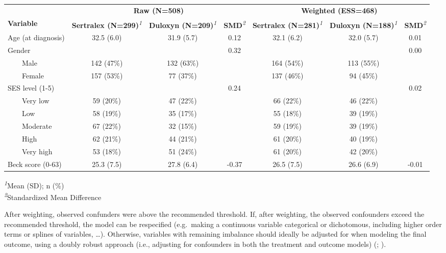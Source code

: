 \documentclass[
]{book}
\begin{document}
\begin{table}[!t]
\fontsize{12.0pt}{14.4pt}\selectfont
\begin{tabular*}{\linewidth}{@{\extracolsep{\fill}}lcccccc}
\toprule
 & \multicolumn{3}{c}{\textbf{Raw (N=508)}} & \multicolumn{3}{c}{\textbf{Weighted (ESS=468)}} \\ 
\cmidrule(lr){2-4} \cmidrule(lr){5-7}
\textbf{Variable} & \textbf{Sertralex (N=299)}\textsuperscript{\textit{1}} & \textbf{Duloxyn (N=209)}\textsuperscript{\textit{1}} & \textbf{SMD}\textsuperscript{\textit{2}} & \textbf{Sertralex (N=281)}\textsuperscript{\textit{1}} & \textbf{Duloxyn (N=188)}\textsuperscript{\textit{1}} & \textbf{SMD}\textsuperscript{\textit{2}} \\ 
\midrule\addlinespace[2.5pt]
Age (at diagnosis) & 32.5 (6.0) & 31.9 (5.7) & 0.12 & 32.1 (6.2) & 32.0 (5.7) & 0.01 \\ 
Gender &  &  & 0.32 &  &  & 0.00 \\ 
    Male & 142 (47\%) & 132 (63\%) &  & 164 (54\%) & 113 (55\%) &  \\ 
    Female & 157 (53\%) & 77 (37\%) &  & 137 (46\%) & 94 (45\%) &  \\ 
SES level (1-5) &  &  & 0.24 &  &  & 0.02 \\ 
    Very low & 59 (20\%) & 47 (22\%) &  & 66 (22\%) & 46 (22\%) &  \\ 
    Low & 58 (19\%) & 35 (17\%) &  & 55 (18\%) & 39 (19\%) &  \\ 
    Moderate & 67 (22\%) & 32 (15\%) &  & 59 (19\%) & 39 (19\%) &  \\ 
    High & 62 (21\%) & 44 (21\%) &  & 61 (20\%) & 40 (19\%) &  \\ 
    Very high & 53 (18\%) & 51 (24\%) &  & 61 (20\%) & 42 (20\%) &  \\ 
Beck score (0-63) & 25.3 (7.5) & 27.8 (6.4) & -0.37 & 26.5 (7.5) & 26.6 (6.9) & -0.01 \\ 
\bottomrule
\end{tabular*}
\begin{minipage}{\linewidth}
\textsuperscript{\textit{1}}Mean (SD); n (\%)\\
\textsuperscript{\textit{2}}Standardized Mean Difference\\
\end{minipage}
\end{table}

After weighting, observed confunders were above the recommended
threshold. If, after weighting, the observed confounders exceed the
recommended threshold, the model can be respecified (e.g.~making a
continuous variable categorical or dichotomous, including higher order
terms or splines of variables, \ldots). Otherwise, variables with
remaining imbalance should ideally be adjusted for when modeling the
final outcome, using a doubly robust approach (i.e., adjusting for
confounders in both the treatment and outcome models)
(;
).
\end{document}
